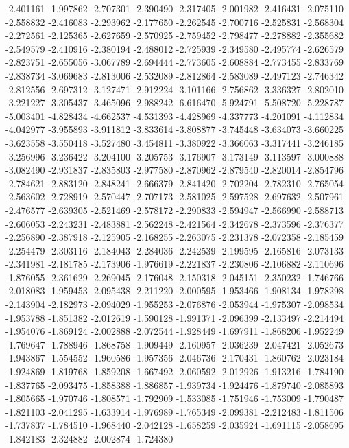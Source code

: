 -2.401161
-1.997862
-2.707301
-2.390490
-2.317405
-2.001982
-2.416431
-2.075110
-2.558832
-2.416083
-2.293962
-2.177650
-2.262545
-2.700716
-2.525831
-2.568304
-2.272561
-2.125365
-2.627659
-2.570925
-2.759452
-2.798477
-2.278882
-2.355682
-2.549579
-2.410916
-2.380194
-2.488012
-2.725939
-2.349580
-2.495774
-2.626579
-2.823751
-2.655056
-3.067789
-2.694444
-2.773605
-2.608884
-2.773455
-2.833769
-2.838734
-3.069683
-2.813006
-2.532089
-2.812864
-2.583089
-2.497123
-2.746342
-2.812556
-2.697312
-3.127471
-2.912224
-3.101166
-2.756862
-3.336327
-2.802010
-3.221227
-3.305437
-3.465096
-2.988242
-6.616470
-5.924791
-5.508720
-5.228787
-5.003401
-4.828434
-4.662537
-4.531393
-4.428969
-4.337773
-4.201091
-4.112834
-4.042977
-3.955893
-3.911812
-3.833614
-3.808877
-3.745448
-3.634073
-3.660225
-3.623558
-3.550418
-3.527480
-3.454811
-3.380922
-3.366063
-3.317441
-3.246185
-3.256996
-3.236422
-3.204100
-3.205753
-3.176907
-3.173149
-3.113597
-3.000888
-3.082490
-2.931837
-2.835803
-2.977580
-2.870962
-2.879540
-2.820014
-2.854796
-2.784621
-2.883120
-2.848241
-2.666379
-2.841420
-2.702204
-2.782310
-2.765054
-2.563602
-2.728919
-2.570447
-2.707173
-2.581025
-2.597528
-2.697632
-2.507961
-2.476577
-2.639305
-2.521469
-2.578172
-2.290833
-2.594947
-2.566990
-2.588713
-2.606053
-2.243231
-2.483881
-2.562248
-2.421564
-2.342678
-2.373596
-2.376377
-2.256890
-2.387918
-2.125905
-2.168255
-2.263075
-2.231378
-2.072358
-2.185459
-2.254479
-2.303116
-2.184043
-2.284036
-2.242539
-2.199595
-2.165816
-2.073133
-2.341981
-2.181785
-2.173906
-1.976619
-2.221837
-2.230806
-2.106882
-2.110696
-1.876055
-2.361629
-2.269045
-2.176048
-2.150318
-2.045151
-2.350232
-1.746766
-2.018083
-1.959453
-2.095438
-2.211220
-2.000595
-1.953466
-1.908134
-1.978298
-2.143904
-2.182973
-2.094029
-1.955253
-2.076876
-2.053944
-1.975307
-2.098534
-1.953788
-1.851382
-2.012619
-1.590128
-1.991371
-2.096399
-2.133497
-2.214494
-1.954076
-1.869124
-2.002888
-2.072544
-1.928449
-1.697911
-1.868206
-1.952249
-1.769647
-1.788946
-1.868758
-1.909449
-2.160957
-2.036239
-2.047421
-2.052673
-1.943867
-1.554552
-1.960586
-1.957356
-2.046736
-2.170431
-1.860762
-2.023184
-1.924869
-1.819768
-1.859208
-1.667492
-2.060592
-2.012926
-1.913216
-1.784190
-1.837765
-2.093475
-1.858388
-1.886857
-1.939734
-1.924476
-1.879740
-2.085893
-1.805665
-1.970746
-1.808571
-1.792909
-1.533085
-1.751946
-1.753009
-1.790487
-1.821103
-2.041295
-1.633914
-1.976989
-1.765349
-2.099381
-2.212483
-1.811506
-1.737837
-1.784510
-1.968440
-2.042128
-1.658259
-2.035924
-1.691115
-2.058695
-1.842183
-2.324882
-2.002874
-1.724380
